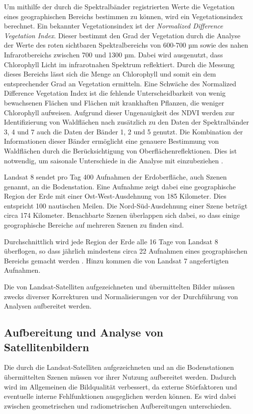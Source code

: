 Um mithilfe der durch die Spektralbänder registrierten Werte die Vegetation eines geographischen Bereichs bestimmen zu können, wird ein Vegetationsindex berechnet. Ein bekannter Vegetationsindex ist der \textit{Normalized Difference Vegetation Index}. Dieser bestimmt den Grad der Vegetation durch die Analyse der Werte des roten sichtbaren Spektralbereichs von 600-700 µm sowie des nahen Infrarotbereichs zwischen 700 und 1300 µm. Dabei wird ausgenutzt, dass Chlorophyll Licht im infrarotnahen Spektrum reflektiert. Durch die Messung dieses Bereichs lässt sich die Menge an Chlorophyll und somit ein dem entsprechender Grad an Vegetation ermitteln. Eine Schwäche des Normalized Difference Vegetation Index ist die fehlende Unterscheidbarkeit von wenig bewachsenen Flächen und Flächen mit krankhaften Pflanzen, die weniger Chlorophyll aufweisen. Aufgrund dieser Ungenauigkeit des NDVI werden zur Identifizierung von Waldflächen nach \cite{Zhu2012} zusätzlich zu den Daten der Spektralbänder 3, 4 und 7 auch die Daten der Bänder 1, 2 und 5 genutzt. Die Kombination der Informationen dieser Bänder ermöglicht eine genauere Bestimmung von Waldflächen durch die Berücksichtigung von Oberflächenreflektionen. Dies ist notwendig, um saisonale Unterschiede in die Analyse mit einzubeziehen \cite{Zhu2012, Masek2008}.

Landsat 8 sendet pro Tag 400 Aufnahmen der Erdoberfläche, auch Szenen genannt, an die Bodenstation. Eine Aufnahme zeigt dabei eine geographische Region der Erde mit einer Ost-West-Ausdehnung von 185 Kilometer. Dies entspricht 100 nautischen Meilen. Die Nord-Süd-Ausdehnung einer Szene beträgt circa 174 Kilometer. Benachbarte Szenen überlappen sich dabei, so dass einige geographische Bereiche auf mehreren Szenen zu finden sind.

Durchschnittlich wird jede Region der Erde alle 16 Tage von Landsat 8 überflogen, so dass jährlich mindestens circa 22 Aufnahmen eines geographischen Bereichs gemacht werden \cite{Irons2012}. Hinzu kommen die von Landsat 7 angefertigten Aufnahmen.

Die von Landsat-Satelliten aufgezeichneten und übermittelten Bilder müssen zwecks diverser Korrekturen und Normalisierungen vor der Durchführung von Analysen aufbereitet werden.


\subsection{Aufbereitung und Analyse von Satellitenbildern}
Die durch die Landsat-Satelliten aufgezeichneten und an die Bodenstationen übermittelten Szenen müssen vor ihrer Nutzung aufbereitet werden. Dadurch wird im Allgemeinen die Bildqualität verbessert, da externe Störfaktoren und eventuelle interne Fehlfunktionen ausgeglichen werden können. Es wird dabei zwischen geometrischen und radiometrischen Aufbereitungen unterschieden. 

